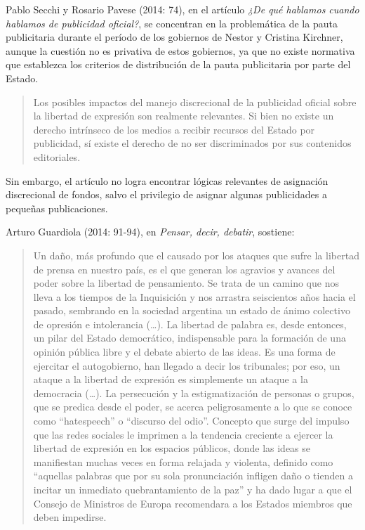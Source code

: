 Pablo Secchi y Rosario Pavese (2014: 74), en el artículo \emph{¿De qué hablamos cuando hablamos de publicidad oficial?}, se concentran en la problemática de la pauta publicitaria durante el período de los gobiernos de Nestor y Cristina Kirchner, aunque la cuestión no es privativa de estos gobiernos, ya que no existe normativa que establezca los criterios de distribución de la pauta publicitaria por parte del Estado.

\begin{quote}
Los posibles impactos del manejo discrecional de la publicidad oficial sobre la libertad de expresión son realmente relevantes. Si bien no existe un derecho intrínseco de los medios a recibir recursos del Estado por publicidad, sí existe el derecho de no ser discriminados por sus contenidos editoriales.
\end{quote}

Sin embargo, el artículo no logra encontrar lógicas relevantes de asignación discrecional de fondos, salvo el privilegio de asignar algunas publicidades a pequeñas publicaciones.

Arturo Guardiola (2014: 91-94), en \emph{Pensar, decir, debatir}, sostiene:

\begin{quote}
Un daño, más profundo que el causado por los ataques que sufre la libertad de prensa en nuestro país, es el que generan los agravios y avances del poder sobre la libertad de pensamiento. Se trata de un camino que nos lleva a los tiempos de la Inquisición y nos arrastra seiscientos años hacia el pasado, sembrando en la sociedad argentina un estado de ánimo colectivo de opresión e intolerancia (\ldots). La libertad de palabra es, desde entonces, un pilar del Estado democrático, indispensable para la formación de una opinión pública libre y el debate abierto de las ideas. Es una forma de ejercitar el autogobierno, han llegado a decir los tribunales; por eso, un ataque a la libertad de expresión es simplemente un ataque a la democracia (\ldots). La persecución y la estigmatización de personas o grupos, que se predica desde el poder, se acerca peligrosamente a lo que se conoce como ``hatespeech'' o ``discurso del odio''. Concepto que surge del impulso que las redes sociales le imprimen a la tendencia creciente a ejercer la libertad de expresión en los espacios públicos, donde las ideas se manifiestan muchas veces en forma relajada y violenta, definido como ``aquellas palabras que por su sola pronunciación infligen daño o tienden a incitar un inmediato quebrantamiento de la paz'' y ha dado lugar a que el Consejo de Ministros de Europa recomendara a los Estados miembros que deben impedirse.
\end{quote}

